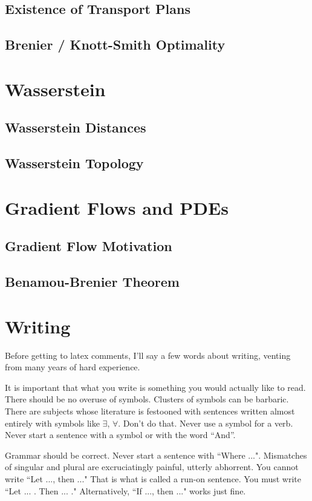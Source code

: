 \documentclass[psamsfonts]{amsart}
\theoremstyle{definition}
\numberwithin{equation}{section}
\begin{document}
\subsection{Existence of Transport Plans}
\subsection{Brenier / Knott-Smith Optimality}
\section{Wasserstein}
\subsection{Wasserstein Distances}
\subsection{Wasserstein Topology}
\section{Gradient Flows and PDEs}
\subsection{Gradient Flow Motivation}
\subsection{Benamou-Brenier Theorem}
\section{Writing}  Before getting to latex comments, I'll say a few words about writing, venting from many years of hard experience. 

It is important that what you write is something you would actually like to read.  There should be no overuse of symbols.
Clusters of symbols can be barbaric.  There are subjects whose literature is festooned with sentences written almost entirely with symbols like $\exists$, $\forall$.  Don't do that. Never use a symbol for a verb.  Never start a sentence with a symbol or with the word ``And''.

Grammar should be correct.  Never start a sentence with ``Where ...".   
Mismatches of singular and plural are excruciatingly painful, utterly abhorrent.  You cannot write
``Let ..., then ..."  That is what is called a run-on sentence. You must write ``Let ... .  Then ... ."
Alternatively, ``If ..., then ..."  works just fine.
\end{document}
